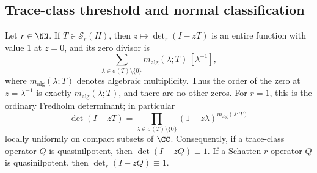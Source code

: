 \subsection{Trace-class threshold and normal classification}
\label{subsec:trace-class-threshold-normal-classification}

\begin{proposition}
  \label{prop:fredholm-regularized-zero-divisor-correspondence}
  Let \(r\in\NN\). If \(T\in\mathcal S_r(H)\), then
  \(z\mapsto\det_r(I-zT)\) is an entire function with value \(1\) at
  \(z=0\), and its zero divisor is
  \[
    \sum_{\lambda\in\sigma(T)\setminus\{0\}}
      m_{\mathrm{alg}}(\lambda;T)\,[\lambda^{-1}],
  \]
  where \(m_{\mathrm{alg}}(\lambda;T)\) denotes algebraic multiplicity.
  Thus the order of the zero at \(z=\lambda^{-1}\) is exactly
  \(m_{\mathrm{alg}}(\lambda;T)\), and there are no other zeros. For
  \(r=1\), this is the ordinary Fredholm determinant; in particular
  \[
    \det(I-zT)
    =\prod_{\lambda\in\sigma(T)\setminus\{0\}}
      (1-z\lambda)^{m_{\mathrm{alg}}(\lambda;T)}
  \]
  locally uniformly on compact subsets of \(\CC\). Consequently, if a
  trace-class operator \(Q\) is quasinilpotent, then
  \(\det(I-zQ)\equiv1\). If a Schatten-\(r\) operator \(Q\) is
  quasinilpotent, then \(\det_r(I-zQ)\equiv1\).
\end{proposition}

